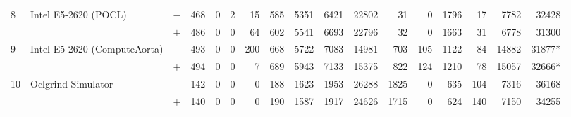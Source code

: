 \begin{tabular}{lll | rrrrrrr | rrrrrrr }
\hline
\multirow{ 2}{*}{8} & \multirow{ 2}{*}{Intel E5-2620 (POCL)} & $-$ & 468 & 0 & 2 & 15 & 585 & 5351 & 6421       & 22802 & 31 & 0 & 1796 & 17 & 7782 & 32428 \\& & $+$ & 486 & 0 & 0 & 64 & 602 & 5541 & 6693 & 22796 & 32 & 0 & 1663 & 31 & 6778 & 31300 \\
\hline
\multirow{ 2}{*}{9} & \multirow{ 2}{*}{Intel E5-2620 (ComputeAorta)} & $-$ & 493 & 0 & 0 & 200 & 668 & 5722 & 7083       & 14981 & 703 & 105 & 1122 & 84 & 14882 & 31877* \\& & $+$ & 494 & 0 & 0 & 7 & 689 & 5943 & 7133 & 15375 & 822 & 124 & 1210 & 78 & 15057 & 32666* \\
\hline
\multirow{ 2}{*}{10} & \multirow{ 2}{*}{Oclgrind Simulator} & $-$ & 142 & 0 & 0 & 0 & 188 & 1623 & 1953       & 26288 & 1825 & 0 & 635 & 104 & 7316 & 36168 \\& & $+$ & 140 & 0 & 0 & 0 & 190 & 1587 & 1917 & 24626 & 1715 & 0 & 624 & 140 & 7150 & 34255 \\
  \bottomrule
\end{tabular}

